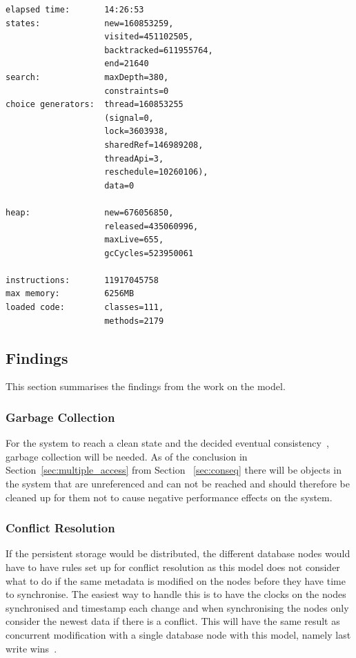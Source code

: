 \documentclass[a4paper,12pt]{article}
\begin{document}
\begin{minipage}{\linewidth}
\begin{lstlisting}[label=JPFRESULT,caption=Results of JPF run]%,float,floatplacement=H]
elapsed time:       14:26:53
states:             new=160853259,
                    visited=451102505,
                    backtracked=611955764,
                    end=21640
search:             maxDepth=380,
                    constraints=0
choice generators:  thread=160853255 
                    (signal=0,
                    lock=3603938,
                    sharedRef=146989208,
                    threadApi=3,
                    reschedule=10260106), 
                    data=0

heap:               new=676056850,
                    released=435060996,
                    maxLive=655,
                    gcCycles=523950061

instructions:       11917045758
max memory:         6256MB
loaded code:        classes=111,
                    methods=2179
\end{lstlisting}
\end{minipage}

\subsection{Findings}
This section summarises the findings from the work on the model. 

\subsubsection{Garbage Collection}
For the system to reach a clean state and the decided eventual consistency~\cite{KLINGSBO}, garbage
collection will be needed. As of the conclusion in Section~\ref{sec:multiple_access} from Section
~\ref{sec:conseq} there will be objects in the system that are unreferenced and can not be reached
and should therefore be cleaned up for them not to cause negative performance effects on the system.

\subsubsection{Conflict Resolution} \label{sec:conflict_res}
If the persistent storage would be distributed, the different database nodes would have to have rules
set up for conflict resolution as this model does not consider what to do if the same metadata is
modified on the nodes before they have time to synchronise. The easiest way to handle this is to
have the clocks on the nodes synchronised and timestamp each change and when synchronising the nodes
only consider the newest data if there is a conflict. This will have the same result as concurrent
modification with a single database node with this model, namely last write
wins~\cite{LASTWRITEWINS}.
\end{document}
